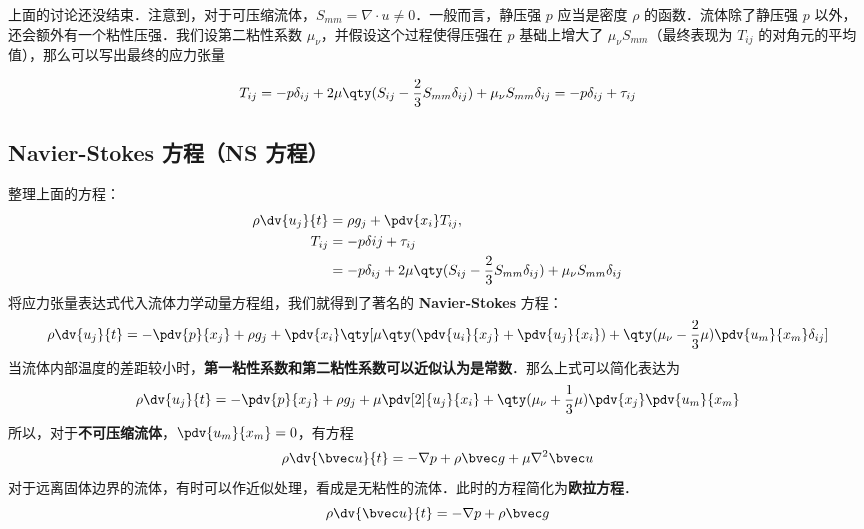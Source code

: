 上面的讨论还没结束．注意到，对于可压缩流体，$S_{mm}=\nabla\cdot u\neq 0$．一般而言，静压强 $p$ 应当是密度 $\rho$ 的函数．流体除了静压强 $p$ 以外，还会额外有一个粘性压强．我们设第二粘性系数 $\mu_\nu$，并假设这个过程使得压强在 $p$ 基础上增大了 $\mu_\nu S_{mm}$（最终表现为 $T_{ij}$ 的对角元的平均值），那么可以写出最终的应力张量

\begin{equation}
T_{ij}=-p\delta_{ij}+2\mu \qty(S_{ij}-\frac{2}{3}S_{mm}\delta_{ij})+\mu_\nu S_{mm} \delta_{ij}=-p\delta_{ij}+\tau_{ij}
\end{equation}

\subsection{Navier-Stokes 方程（NS 方程）}
整理上面的方程：
\begin{equation}
\begin{aligned}
\rho \dv{u_j}{t}&=\rho g_j+\pdv{x_i} T_{ij},\\
T_{ij}&=-p\delta{ij}+\tau_{ij}\\
&=-p\delta_{ij}+2\mu \qty(S_{ij}-\frac{2}{3}S_{mm}\delta_{ij})+\mu_\nu S_{mm} \delta_{ij}
\end{aligned}
\end{equation}
将应力张量表达式代入流体力学动量方程组，我们就得到了著名的 \textbf{Navier-Stokes} 方程：
\begin{equation}
\rho \dv{u_j}{t}=-\pdv{p}{x_j}+\rho g_j+\pdv{x_i} \qty[\mu\qty(\pdv{u_i}{x_j}+\pdv{u_j}{x_i})+\qty(\mu_\nu-\frac{2}{3}\mu)\pdv{u_m}{x_m}\delta_{ij}]
\end{equation}
当流体内部温度的差距较小时，\textbf{第一粘性系数和第二粘性系数可以近似认为是常数}．那么上式可以简化表达为
\begin{equation}
\rho \dv{u_j}{t}=-\pdv{p}{x_j}+\rho g_j+\mu\pdv[2]{u_j}{x_i} +\qty(\mu_\nu+\frac{1}{3}\mu)\pdv{x_j}\pdv{u_m}{x_m}
\end{equation}
所以，对于\textbf{不可压缩流体}，$\pdv{u_m}{x_m}=0$，有方程
\begin{equation}
\rho \dv{\bvec u}{t}=-\nabla p+\rho \bvec g+\mu \nabla^2 \bvec u
\end{equation}
对于远离固体边界的流体，有时可以作近似处理，看成是无粘性的流体．此时的方程简化为\textbf{欧拉方程}．
\begin{equation}
\rho \dv{\bvec u}{t}=-\nabla p+\rho \bvec g
\end{equation}
